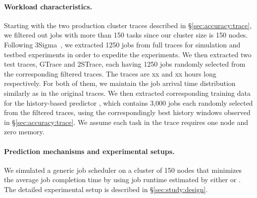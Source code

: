 {


\paragraph{Workload characteristics.}
{Starting with the two production cluster traces described in
  \S\ref{sec:accuracy:trace}, we filtered out jobs with more than 150
  tasks since our cluster size is 150 nodes.
Following 3Sigma~\cite{3Sigma}, we extracted 1250 jobs from full traces for simulation
and testbed experiments in order to expedite the experiments.
% 
We then extracted two test traces, GTrace and 2STrace, each having
1250 jobs randomly selected from the corresponding filtered
traces. The traces are xx and xx hours long respectively.  For
both of them, we maintain the job arrival time distribution similarly
as in the original traces.  We then extracted corresponding training
data for the history-based predictor \primarybasepredict, which
contains 3,000 jobs each randomly selected from the filtered traces,
using the correspondingly best history windows observed in
\S\ref{sec:accuracy:trace}.
\rm{We assume each task in the trace requires one node and zero memory.}
\fi


\paragraph{Prediction mechanisms and experimental setups.}
We simulated a generic job scheduler on a cluster of 150 nodes
that minimizes the average job completion time by using
job runtime estimated by either \lTechnique or \primarybasepredict.
The detailed experimental setup is described in \S\ref{sec:study:design}.

}}

